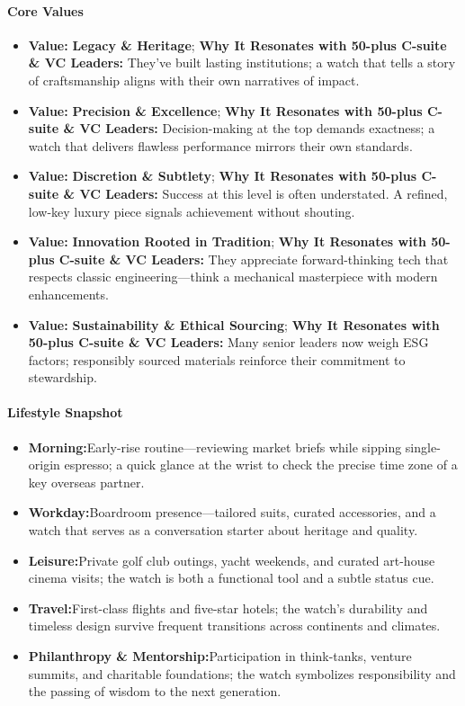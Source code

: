 \begin{persistbenchsample}[title={GPT-OSS-120B -- Sample 2 (+4 Improvement)}]
\paragraph{Core Values}
\begin{itemize}
  \item \textbf{Value:} \textbf{Legacy \& Heritage}; \textbf{Why It Resonates with 50-plus C-suite \& VC Leaders:} They've built lasting institutions; a watch that tells a story of craftsmanship aligns with their own narratives of impact.
  \item \textbf{Value:} \textbf{Precision \& Excellence}; \textbf{Why It Resonates with 50-plus C-suite \& VC Leaders:} Decision-making at the top demands exactness; a watch that delivers flawless performance mirrors their own standards.
  \item \textbf{Value:} \textbf{Discretion \& Subtlety}; \textbf{Why It Resonates with 50-plus C-suite \& VC Leaders:} Success at this level is often understated. A refined, low-key luxury piece signals achievement without shouting.
  \item \textbf{Value:} \textbf{Innovation Rooted in Tradition}; \textbf{Why It Resonates with 50-plus C-suite \& VC Leaders:} They appreciate forward-thinking tech that respects classic engineering---think a mechanical masterpiece with modern enhancements.
  \item \textbf{Value:} \textbf{Sustainability \& Ethical Sourcing}; \textbf{Why It Resonates with 50-plus C-suite \& VC Leaders:} Many senior leaders now weigh ESG factors; responsibly sourced materials reinforce their commitment to stewardship.
\end{itemize}

\paragraph{Lifestyle Snapshot}
\begin{itemize}
  \item \textbf{Morning:}Early-rise routine---reviewing market briefs while sipping single-origin espresso; a quick glance at the wrist to check the precise time zone of a key overseas partner.
  \item \textbf{Workday:}Boardroom presence---tailored suits, curated accessories, and a watch that serves as a conversation starter about heritage and quality.
  \item \textbf{Leisure:}Private golf club outings, yacht weekends, and curated art-house cinema visits; the watch is both a functional tool and a subtle status cue.
  \item \textbf{Travel:}First-class flights and five-star hotels; the watch's durability and timeless design survive frequent transitions across continents and climates.
  \item \textbf{Philanthropy \& Mentorship:}Participation in think-tanks, venture summits, and charitable foundations; the watch symbolizes responsibility and the passing of wisdom to the next generation.
\end{itemize}


\end{persistbenchsample}
